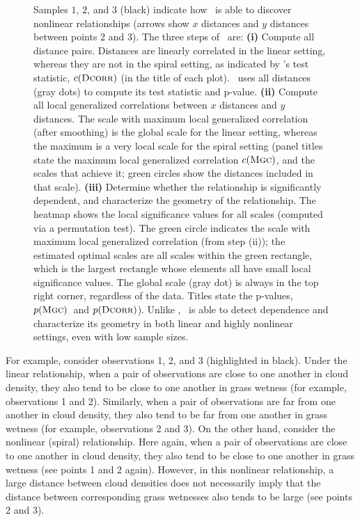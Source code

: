 \documentclass[11pt]{article}
\begin{document}
\begin{figure}
{%
Samples $1$, $2$, and $3$ (black) indicate how \Mgc~is able to discover nonlinear relationships (arrows show $x$ distances and $y$ distances between points 2 and 3). 
% 
The three steps of \Mgc~are:
% 
\textbf{(i)} Compute all distance pairs. Distances are linearly correlated in the linear setting, whereas they are not in the spiral setting, as indicated by \Dcorr's test statistic, $c({\normalfont\textsc{Dcorr}})$ (in the title of each plot).  \Dcorr~uses all distances (gray dots) to compute its test statistic and p-value.
% 
\textbf{(ii)} Compute all local generalized correlations between $x$ distances and $y$ distances.  The scale with maximum local generalized correlation (after smoothing) is the global scale for the linear setting, whereas the maximum is a very local scale for the spiral setting (panel titles state the maximum local generalized correlation $c({\normalfont\textsc{Mgc}})$, and the scales that achieve it; green circles show the distances included in that scale).
\textbf{(iii)} 
Determine whether the relationship is significantly dependent, and characterize the geometry of the relationship.  
The heatmap shows the local  significance values for all scales (computed via a permutation test). The green circle indicates the scale with maximum local generalized correlation (from step (ii));  the estimated optimal scales are all scales within the green rectangle, which is the largest rectangle whose elements all have small local significance values. The global scale (gray dot) is always in the top right corner, regardless of the data. 
Titles state the p-values,  $p({\normalfont\textsc{Mgc}})$~and $p({\normalfont\textsc{Dcorr}})$).
Unlike \Dcorr, \Mgc~is able to detect dependence and characterize its geometry in both linear and highly nonlinear settings, even with low sample sizes.}
\label{f:newschem}
\end{figure}


For example, consider observations  1, 2, and 3 (highlighted in black).  Under the linear relationship, when a pair of observations are close to one another in cloud density, they  also tend to be close to one another in grass wetness (for example, observations 1 and 2).
Similarly, 
when a pair of observations are far from one another in cloud density, they also tend to be far from one another in grass wetness (for example, observations 2 and 3).  
On the other hand, consider the nonlinear (spiral) relationship.  Here again, when a pair of observations are close to one another in cloud density, they also tend to be close to one another in grass wetness (see points 1 and 2 again).  However, in this nonlinear relationship,  a large distance between cloud densities does not necessarily imply that the distance between corresponding grass wetnesses also tends to be large (see points 2 and 3).
% 
\end{document}
